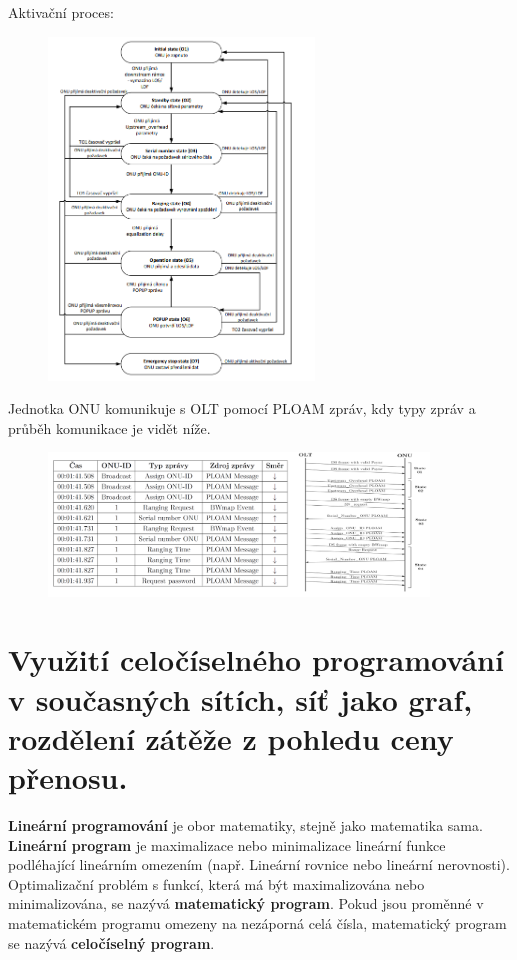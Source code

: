 Aktivační proces:
\begin{figure} [h]
    \centering
    \includegraphics[width=0.63\textwidth]{snimky/proces.png}
    \label{fig:gpon-proces}
\end{figure}

Jednotka ONU komunikuje s OLT pomocí PLOAM zpráv, kdy typy zpráv a průběh komunikace je vidět níže.

\begin{figure} [h]
    \centering
    \includegraphics[width=0.9\textwidth]{snimky/aktivaceONU.png}
\end{figure}


\clearpage
\section{Využití celočíselného programování v současných sítích, síť jako graf, rozdělení zátěže z pohledu ceny přenosu.}
\textbf{Lineární programování} je obor matematiky, stejně jako matematika sama. \textbf{Lineární program} je maximalizace nebo minimalizace lineární funkce podléhající lineárním omezením (např. Lineární rovnice nebo lineární nerovnosti). Optimalizační problém s funkcí, která má být maximalizována nebo minimalizována, se nazývá \textbf{matematický program}. Pokud jsou proměnné v matematickém programu omezeny na nezáporná celá čísla, matematický program se nazývá \textbf{celočíselný program}.

